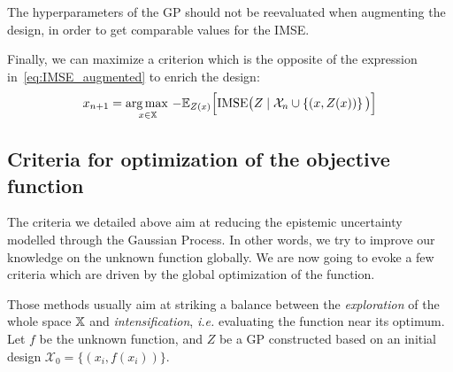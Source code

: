 \documentclass[../../Main_ManuscritThese.tex]{subfiles}
\newcommand\imgpath{/home/victor/acadwriting/Manuscrit/Text/Chapter4/img/}
\begin{document}
The hyperparameters of the GP should not be reevaluated when augmenting the design, in order to get comparable values for the IMSE.\@

Finally, we can maximize a criterion which is the opposite of the expression in~\cref{eq:IMSE_augmented} to enrich the design:
\begin{equation}
  x_{n+1} = \operatorname*{arg\,max \,}_{x\in \mathbb{X}}-\mathbb{E}_{Z(x)}\Big[\mathrm{IMSE} \big(Z \mid \mathcal{X}_n \cup \left\{(x, Z(x))\right\} \big)\Big]
\end{equation}

%   


\subsection{Criteria for optimization of the objective function}
\label{sec:GP_optimization_criteria}
The criteria we detailed above aim at reducing the epistemic uncertainty modelled through the Gaussian Process. In other words, we try to improve our knowledge on the unknown function globally. We are now going to evoke a few criteria which are driven by the global optimization of the function.

Those methods usually aim at striking a balance between the \emph{exploration} of the whole space $\mathbb{X}$ and \emph{intensification}, \textit{i.e.} evaluating the function near its optimum.
Let $f$ be the unknown function, and $Z$ be a GP constructed based on an initial design $\mathcal{X}_0 = \{(x_i, f(x_i))\}$.
\end{document}

